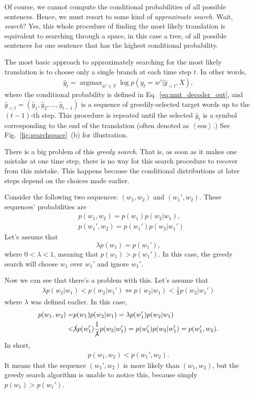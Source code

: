 \documentclass{report}
\newcommand{\eos}[0]{\ensuremath{\left< \text{eos}\right>}}
\DeclareMathOperator*{\argmax}{\arg \max}
\begin{document}
Of course, we cannot compute the conditional probabilities of all possible
sentences. Hence, we must resort to some kind of {\em approximate search}. Wait,
{\em search}? Yes, this whole procedure of finding the most likely translation
is equivalent to searching through a space, in this case a tree, of all possible
sentences for one sentence that has the highest conditional probability.

The most basic approach to approximately searching for the most likely
translation is to choose only a single branch at each time step $t$. In other
words, 
\begin{align*}
    \hat{y}_t = \argmax_{w' \in V} \log p(y_t = w' | \hat{y}_{<t}, X),
\end{align*}
where the conditional probability is defined in Eq.~\eqref{eq:nmt_decoder_out},
and $\hat{y}_{<t}=(\hat{y}_1, \hat{y}_2, \ldots, \hat{y}_{t-1})$ is a sequence
of greedily-selected target words up to the $(t-1)$-th step. This procedure is
repeated until the selected $\hat{y}_t$ is a symbol corresponding to the end of
the translation (often denoted as \eos{}.) See Fig.~\ref{fig:searchspace}~(b)
for illustration.

There is a big problem of this {\em greedy search}. That is, as soon as it makes
one mistake at one time step, there is no way for this search procedure to
recover from this mistake. This happens because the conditional distributions at
later steps depend on the choices made earlier. 

Consider the following two sequences: $\left(w_1, w_2\right)$ and $\left(w_1',
w_2\right)$. These sequences' probabilities are 
\begin{align*}
    &p(w_1, w_2) = p(w_1) p(w_2 | w_1), \\
    &p(w_1', w_2)= p(w_1') p(w_2 | w_1')
\end{align*}
Let's assume that 
\[
    \lambda p(w_1) = p(w_1'),
\]
where $0 < \lambda < 1$, meaning that $p(w_1) > p(w_1')$. In this case, the
greedy search will choose $w_1$ over $w_1'$ and ignore $w_1'$.

Now we can see that there's a problem with this. Let's assume that
\begin{align*}
    \lambda p(w_2 | w_1) < p(w_2 | w_1') \iff p(w_2 | w_1) < \frac{1}{\lambda}
    p(w_2 | w_1')
\end{align*}
where $\lambda$ was defined earlier. In this case,
\begin{align*}
    p(w_1, w_2) =& p(w_1) p(w_2 | w_1) 
    = \lambda p(w_1') p(w_2 | w_1) \\ <&
    \cancel{\lambda} p(w_1') \frac{1}{\cancel{\lambda}} p(w_2 | w_1') 
    = p(w_1') p(w_2 | w_1') = p(w_1', w_2).
\end{align*}
In short,
\begin{align*}
    p(w_1, w_2) < p(w_1', w_2).
\end{align*}
It means that the sequence $(w_1',w_2)$ is more likely than $(w_1, w_2)$, but
the greedy search algorithm is unable to notice this, because simply $p(w_1) >
p(w_1')$.  
\end{document}
